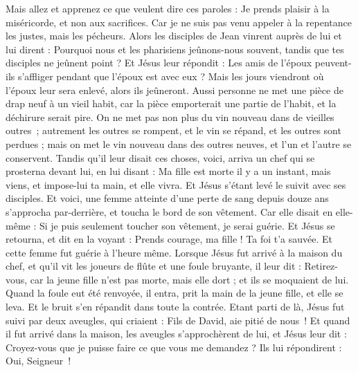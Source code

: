\begin{multicols}{2}
{Mais allez et apprenez ce que veulent dire ces paroles : Je prends plaisir à la miséricorde, et non aux sacrifices{}. Car je ne suis pas venu appeler à la repentance les justes, mais les pécheurs.
Alors les disciples de Jean vinrent auprès de lui et lui dirent : Pourquoi nous et les pharisiens jeûnons-nous souvent, tandis que tes disciples ne jeûnent point ?
Et Jésus leur répondit : Les amis de l’époux peuvent-ils s'affliger pendant que l’époux est avec eux ? Mais les jours viendront où l’époux leur sera enlevé, alors ils jeûneront.
Aussi personne ne met une pièce de drap neuf à un vieil habit, car la pièce emporterait une partie de l’habit, et la déchirure serait pire.
On ne met pas non plus du vin nouveau dans de vieilles outres ; autrement les outres se rompent, et le vin se répand, et les outres sont perdues ; mais on met le vin nouveau dans des outres neuves, et l'un et l'autre se conservent.
Tandis qu’il leur disait ces choses, voici, arriva un chef qui se prosterna devant lui, en lui disant : Ma fille est morte il y a un instant, mais viens, et impose-lui ta main, et elle vivra.
Et Jésus s'étant levé le suivit avec ses disciples.
Et voici, une femme atteinte d'une perte de sang depuis douze ans s’approcha par-derrière, et toucha le bord de son vêtement.
Car elle disait en elle-même : Si je puis seulement toucher son vêtement, je serai guérie.
Et Jésus se retourna, et dit en la voyant : Prends courage, ma fille ! Ta foi t'a sauvée. Et cette femme fut guérie à l’heure même.
Lorsque Jésus fut arrivé à la maison du chef, et qu'il vit les joueurs de flûte et une foule bruyante,
il leur dit : Retirez-vous, car la jeune fille n'est pas morte, mais elle dort ; et ils se moquaient de lui.
Quand la foule eut été renvoyée, il entra, prit la main de la jeune fille, et elle se leva.
Et le bruit s'en répandit dans toute la contrée.
Etant parti de là, Jésus fut suivi par deux aveugles, qui criaient : Fils de David, aie pitié de nous !
Et quand il fut arrivé dans la maison, les aveugles s’approchèrent de lui, et Jésus leur dit : Croyez-vous que je puisse faire ce que vous me demandez ? Ils lui répondirent : Oui, Seigneur !
}
\end{multicols}
